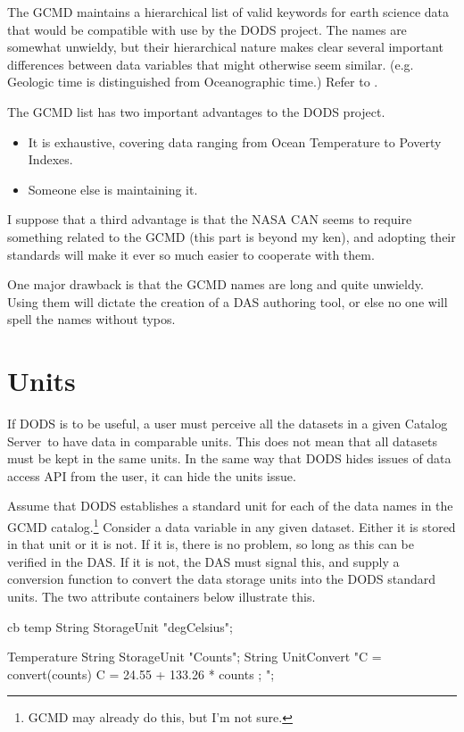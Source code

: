 \documentclass[10pt]{report}
\newcommand{\cs}{Catalog Server}
\begin{document}
The GCMD maintains a hierarchical list of valid keywords for earth
science data that would be compatible with use by the DODS project.
The names are somewhat unwieldy, but their hierarchical nature makes
clear several important differences between data variables that might
otherwise seem similar.  (e.g. Geologic time is distinguished from
Oceanographic time.)  Refer to
.

The GCMD list has two important advantages to the DODS project.

\begin{itemize}
\item It is exhaustive, covering data ranging from Ocean Temperature to
  Poverty Indexes.
\item Someone else is maintaining it.
\end{itemize}

I suppose that a third advantage is that the NASA CAN seems to require
something related to the GCMD (this part is beyond my ken), and
adopting their standards will make it ever so much easier to cooperate
with them.

One major drawback is that the GCMD names are long and quite
unwieldy.  Using them will dictate the creation of a DAS authoring
tool, or else no one will spell the names without typos.


\section{Units}
\label{sec:units}

If DODS is to be useful, a user must perceive all the datasets in a
given \cs\ to have data in comparable units.  This does not mean that
all datasets must be kept in the same units.  In the same way that
DODS hides issues of data access API from the user, it can hide the
units issue.

Assume that DODS establishes a standard unit for each of the data
names in the GCMD catalog.\footnote{GCMD may already do this, but I'm
  not sure.}  Consider a data variable in any given dataset.  Either
it is stored in that unit or it is not.  If it is, there is no
problem, so long as this can be verified in the DAS.  If it is not,
the DAS must signal this, and supply a conversion function to convert
the data storage units into the DODS standard units.  The two
attribute containers below illustrate this.

\begin{code}{cb}
temp {
  String StorageUnit "degCelsius";
}

Temperature {
  String StorageUnit "Counts";
  String UnitConvert "C = convert(counts) {
    C = 24.55 + 133.26 * counts ;
  }";
}
\end{code}
\end{document}
